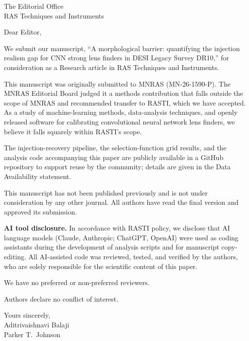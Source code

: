 \documentclass[11pt]{letter}
\date{21 June 2026}
\begin{document}
\begin{letter}{The Editorial Office \\
RAS Techniques and Instruments}

\opening{Dear Editor,}

We submit our manuscript, ``A morphological barrier: quantifying the
injection realism gap for CNN strong lens finders in DESI Legacy Survey
DR10,'' for consideration as a Research article in RAS Techniques and
Instruments.

This manuscript was originally submitted to MNRAS (MN-26-1590-P). The
MNRAS Editorial Board judged it a methods contribution that falls outside
the scope of MNRAS and recommended transfer to RASTI, which we have
accepted. As a study of machine-learning methods, data-analysis
techniques, and openly released software for calibrating convolutional
neural network lens finders, we believe it falls squarely within RASTI's
scope.

The injection-recovery pipeline, the selection-function grid results, and
the analysis code accompanying this paper are publicly available in a
GitHub repository to support reuse by the community; details are given in
the Data Availability statement.

This manuscript has not been published previously and is not under
consideration by any other journal. All authors have read the final
version and approved its submission.

\medskip
\noindent\textbf{AI tool disclosure.}
In accordance with RASTI policy, we disclose that AI language models
(Claude, Anthropic; ChatGPT, OpenAI) were used as coding assistants
during the development of analysis scripts and for manuscript
copy-editing. All AI-assisted code was reviewed, tested, and verified by
the authors, who are solely responsible for the scientific content of
this paper.

\medskip
We have no preferred or non-preferred reviewers.

\medskip
\noindent Authors declare no conflict of interest.

\bigskip
\noindent Yours sincerely,\\[6pt]
Aditrivaishnavi Balaji\\
Parker T.\ Johnson

\end{letter}
\end{document}
